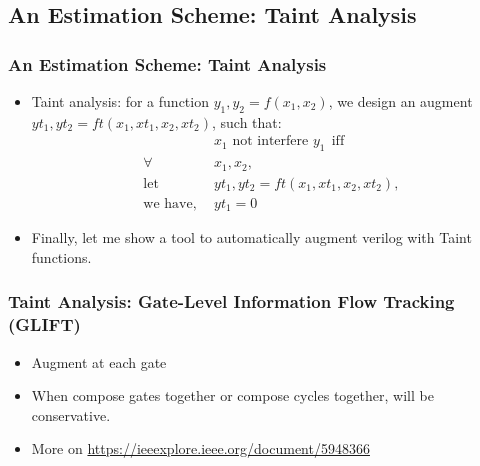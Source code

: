\documentclass{beamer}
\begin{document}
\subsection{An Estimation Scheme: Taint Analysis}

\begin{frame}
\frametitle{An Estimation Scheme: Taint Analysis}
\begin{itemize}
  \item<1-> Taint analysis: for a function $y_1, y_2 = f(x_1, x_2)$, we design an augment $yt_1, yt_2 = ft(x_1, xt_1, x_2, xt_2)$, such that:
  \begin{align*}
    & \text{$x_1$ not interfere $y_1$} ~~ \text{iff} \\
    \forall ~~& x_1, x_2, \\
    \text{let} ~~& yt_1, yt_2 = ft(x_1, xt_1, x_2, xt_2), \\
    \text{we have}, ~~& yt_1 = 0
  \end{align*}
  \item<2-> Finally, let me show a tool to automatically augment verilog with Taint functions. 
\end{itemize}
\end{frame}




\begin{frame}
\frametitle{Taint Analysis: Gate-Level Information Flow Tracking (GLIFT)}
\begin{itemize}
  \item<1-> Augment at each gate
  \item<2-> When compose gates together or compose cycles together, will be conservative.
  \item<1-> More on \url{https://ieeexplore.ieee.org/document/5948366}
\end{itemize}
\end{frame}




\end{document}
